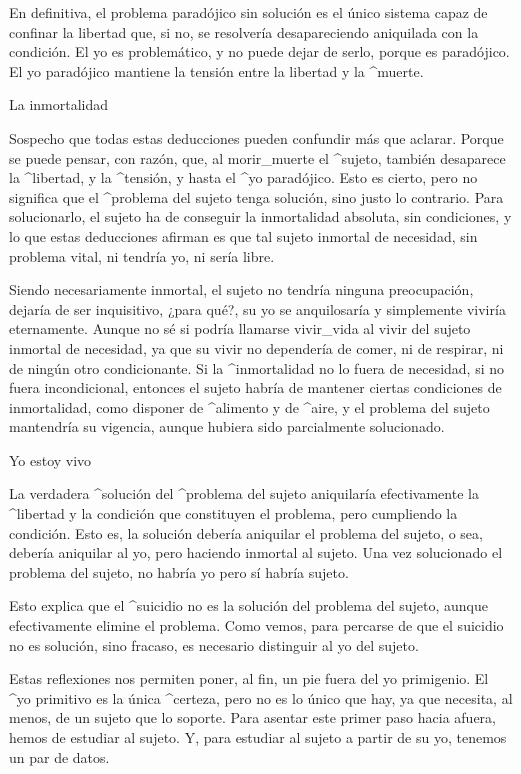 En definitiva, el problema paradójico sin solución es el único sistema
capaz de confinar la libertad que, si no, se resolvería desapareciendo
aniquilada con la condición. El yo es problemático, y no puede dejar de
serlo, porque es paradójico. El yo paradójico mantiene la tensión entre
la libertad y la ^{muerte}.


\Section La inmortalidad

Sospecho que todas estas deducciones pueden confundir más que aclarar.
Porque se puede pensar, con razón, que, al morir_{muerte} el ^{sujeto},
también desaparece la ^{libertad}, y la ^{tensión}, y hasta el ^{yo}
paradójico. Esto es cierto, pero no significa que el ^{problema del
sujeto} tenga solución, sino justo lo contrario. Para solucionarlo, el
sujeto ha de conseguir la inmortalidad absoluta, sin condiciones, y lo
que estas deducciones afirman es que tal sujeto inmortal de necesidad,
sin problema vital, ni tendría yo, ni sería libre.

Siendo necesariamente inmortal, el sujeto no tendría ninguna
preocupación, dejaría de ser inquisitivo, ¿para qué?, su yo se
anquilosaría y simplemente viviría eternamente. Aunque no sé si podría
llamarse vivir_{vida} al vivir del sujeto inmortal de necesidad, ya que
su vivir no dependería de comer, ni de respirar, ni de ningún otro
condicionante. Si la ^{inmortalidad} no lo fuera de necesidad, si no
fuera incondicional, entonces el sujeto habría de mantener ciertas
condiciones de inmortalidad, como disponer de ^{alimento} y de ^{aire},
y el problema del sujeto mantendría su vigencia, aunque hubiera sido
parcialmente solucionado.


\Section Yo estoy vivo

La verdadera ^{solución} del ^{problema del sujeto} aniquilaría
efectivamente la ^{libertad} y la condición que constituyen el problema,
pero cumpliendo la condición. Esto es, la solución debería aniquilar el
problema del sujeto, o sea, debería aniquilar al yo, pero haciendo
inmortal al sujeto. Una vez solucionado el problema del sujeto, no
habría yo pero sí habría sujeto.

Esto explica que el ^{suicidio} no es la solución del problema del
sujeto, aunque efectivamente elimine el problema. Como vemos, para
percarse de que el suicidio no es solución, sino fracaso, es necesario
distinguir al yo del sujeto.

Estas reflexiones nos permiten poner, al fin, un pie fuera del yo
primigenio. El ^{yo} primitivo es la única ^{certeza}, pero no es lo
único que hay, ya que necesita, al menos, de un sujeto que lo soporte.
Para asentar este primer paso hacia afuera, hemos de estudiar al sujeto.
Y, para estudiar al sujeto a partir de su yo, tenemos un par de datos.

